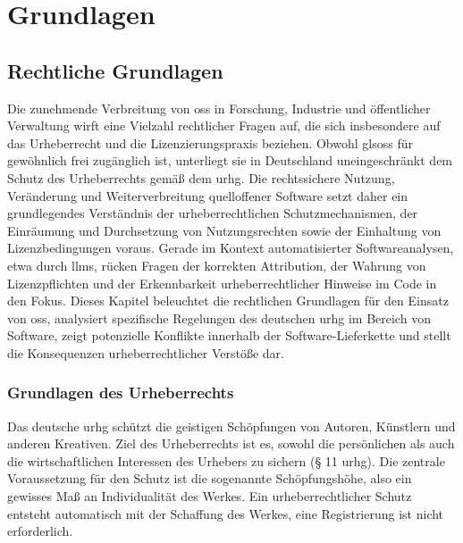\chapter{Grundlagen}\label{ch:grundlagen}


\section{Rechtliche Grundlagen}\label{sec:rechtliches}

Die zunehmende Verbreitung von \gls{oss} in Forschung, Industrie und öffentlicher Verwaltung wirft eine Vielzahl rechtlicher Fragen auf, die sich insbesondere auf das Urheberrecht und die Lizenzierungspraxis beziehen.
Obwohl gls{oss} für gewöhnlich frei zugänglich ist, unterliegt sie in Deutschland uneingeschränkt dem Schutz des Urheberrechts gemäß dem \gls{urhg}\autocite{noauthor_urhg_nodate}.
Die rechtssichere Nutzung, Veränderung und Weiterverbreitung quelloffener Software setzt daher ein grundlegendes Verständnis der urheberrechtlichen Schutzmechanismen, der Einräumung und Durchsetzung von Nutzungsrechten sowie der Einhaltung von Lizenzbedingungen voraus.
Gerade im Kontext automatisierter Softwareanalysen, etwa durch \glspl{llm}, rücken Fragen der korrekten Attribution, der Wahrung von Lizenzpflichten und der Erkennbarkeit urheberrechtlicher Hinweise im Code in den Fokus.
Dieses Kapitel beleuchtet die rechtlichen Grundlagen für den Einsatz von \gls{oss}, analysiert spezifische Regelungen des deutschen \gls{urhg} im Bereich von Software, zeigt potenzielle Konflikte innerhalb der Software-Lieferkette und stellt die Konsequenzen urheberrechtlicher Verstöße dar.


\subsection{Grundlagen des Urheberrechts}\label{subsec:grundlagen-des-urheberrechts}

Das deutsche \acrlong{urhg} schützt die geistigen Schöpfungen von Autoren, Künstlern und anderen Kreativen.
Ziel des Urheberrechts ist es, sowohl die persönlichen als auch die wirtschaftlichen Interessen des Urhebers zu sichern (§ 11 \gls{urhg}).
Die zentrale Voraussetzung für den Schutz ist die sogenannte Schöpfungshöhe, also ein gewisses Maß an Individualität des Werkes.
Ein urheberrechtlicher Schutz entsteht automatisch mit der Schaffung des Werkes, eine Registrierung ist nicht erforderlich.

